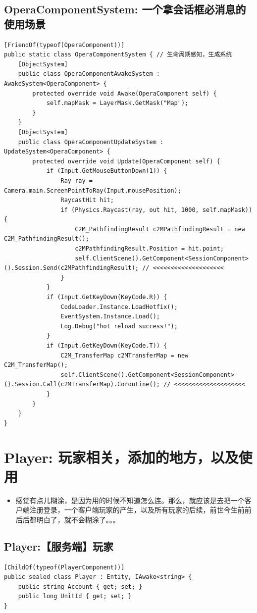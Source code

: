 \documentclass[9pt, b5paper]{article}
\begin{document}
\subsection{OperaComponentSystem: 一个拿会话框必消息的使用场景}
\label{sec-8-3}
\begin{verbatim}
[FriendOf(typeof(OperaComponent))]
public static class OperaComponentSystem { // 生命周期感知，生成系统
    [ObjectSystem]
    public class OperaComponentAwakeSystem : AwakeSystem<OperaComponent> {
        protected override void Awake(OperaComponent self) {
            self.mapMask = LayerMask.GetMask("Map");
        }
    }
    [ObjectSystem]
    public class OperaComponentUpdateSystem : UpdateSystem<OperaComponent> {
        protected override void Update(OperaComponent self) {
            if (Input.GetMouseButtonDown(1)) {
                Ray ray = Camera.main.ScreenPointToRay(Input.mousePosition);
                RaycastHit hit;
                if (Physics.Raycast(ray, out hit, 1000, self.mapMask)) {
                    C2M_PathfindingResult c2MPathfindingResult = new C2M_PathfindingResult();
                    c2MPathfindingResult.Position = hit.point;
                    self.ClientScene().GetComponent<SessionComponent>().Session.Send(c2MPathfindingResult); // <<<<<<<<<<<<<<<<<<<< 
                }
            }
            if (Input.GetKeyDown(KeyCode.R)) {
                CodeLoader.Instance.LoadHotfix();
                EventSystem.Instance.Load();
                Log.Debug("hot reload success!");
            }
            if (Input.GetKeyDown(KeyCode.T)) {
                C2M_TransferMap c2MTransferMap = new C2M_TransferMap();
                self.ClientScene().GetComponent<SessionComponent>().Session.Call(c2MTransferMap).Coroutine(); // <<<<<<<<<<<<<<<<<<<< 
            }
        }
    }
}
\end{verbatim}

\section{Player: 玩家相关，添加的地方，以及使用}
\label{sec-9}
\begin{itemize}
\item 感觉有点儿糊涂，是因为用的时候不知道怎么连。那么，就应该是去把一个客户端注册登录，一个客户端玩家的产生，以及所有玩家的后续，前世今生前前后后都明白了，就不会糊涂了。。。
\end{itemize}
\subsection{Player:【服务端】玩家}
\label{sec-9-1}
\begin{verbatim}
[ChildOf(typeof(PlayerComponent))]
public sealed class Player : Entity, IAwake<string> {
    public string Account { get; set; }
    public long UnitId { get; set; }
}
\end{verbatim}
\end{document}
